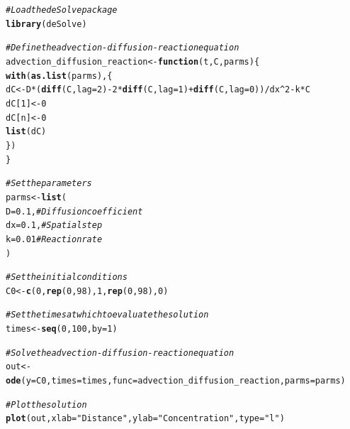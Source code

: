 \documentclass{tufte-handout}\usepackage[]{graphicx}\usepackage[]{xcolor}
\makeatletter
\newcommand{\hlnum}[1]{\textcolor[rgb]{0.686,0.059,0.569}{#1}}%
\newcommand{\hlstr}[1]{\textcolor[rgb]{0.192,0.494,0.8}{#1}}%
\newcommand{\hlcom}[1]{\textcolor[rgb]{0.678,0.584,0.686}{\textit{#1}}}%
\newcommand{\hlopt}[1]{\textcolor[rgb]{0,0,0}{#1}}%
\newcommand{\hlstd}[1]{\textcolor[rgb]{0.345,0.345,0.345}{#1}}%
\newcommand{\hlkwa}[1]{\textcolor[rgb]{0.161,0.373,0.58}{\textbf{#1}}}%
\newcommand{\hlkwb}[1]{\textcolor[rgb]{0.69,0.353,0.396}{#1}}%
\newcommand{\hlkwc}[1]{\textcolor[rgb]{0.333,0.667,0.333}{#1}}%
\newcommand{\hlkwd}[1]{\textcolor[rgb]{0.737,0.353,0.396}{\textbf{#1}}}%
\newenvironment{kframe}{%
 \def\at@end@of@kframe{}%
 \ifinner\ifhmode%
  \def\at@end@of@kframe{\end{minipage}}%
  \begin{minipage}{\columnwidth}%
 \fi\fi%
 \def\FrameCommand##1{\hskip\@totalleftmargin \hskip-\fboxsep
 \colorbox{shadecolor}{##1}\hskip-\fboxsep
     \hskip-\linewidth \hskip-\@totalleftmargin \hskip\columnwidth}%
 \MakeFramed {\advance\hsize-\width
   \@totalleftmargin\z@ \linewidth\hsize
   \@setminipage}}%
 {\par\unskip\endMakeFramed%
 \at@end@of@kframe}
\newenvironment{knitrout}{}{} %
\makeatother
\begin{document}
\begin{knitrout}
\color{fgcolor}\begin{kframe}
\begin{alltt}
\hlcom{# Load the deSolve package}
\hlkwd{library}\hlstd{(deSolve)}

\hlcom{# Define the advection-diffusion-reaction equation}
\hlstd{advection_diffusion_reaction} \hlkwb{<-} \hlkwa{function}\hlstd{(}\hlkwc{t}\hlstd{,} \hlkwc{C}\hlstd{,} \hlkwc{parms}\hlstd{) \{}
  \hlkwd{with}\hlstd{(}\hlkwd{as.list}\hlstd{(parms), \{}
    \hlstd{dC} \hlkwb{<-} \hlstd{D} \hlopt{*} \hlstd{(}\hlkwd{diff}\hlstd{(C,} \hlkwc{lag} \hlstd{=} \hlnum{2}\hlstd{)} \hlopt{-} \hlnum{2} \hlopt{*} \hlkwd{diff}\hlstd{(C,} \hlkwc{lag} \hlstd{=} \hlnum{1}\hlstd{)} \hlopt{+} \hlkwd{diff}\hlstd{(C,} \hlkwc{lag} \hlstd{=} \hlnum{0}\hlstd{))} \hlopt{/} \hlstd{dx}\hlopt{^}\hlnum{2} \hlopt{-} \hlstd{k} \hlopt{*} \hlstd{C}
    \hlstd{dC[}\hlnum{1}\hlstd{]} \hlkwb{<-} \hlnum{0}
    \hlstd{dC[n]} \hlkwb{<-} \hlnum{0}
    \hlkwd{list}\hlstd{(dC)}
  \hlstd{\})}
\hlstd{\}}

\hlcom{# Set the parameters}
\hlstd{parms} \hlkwb{<-} \hlkwd{list}\hlstd{(}
  \hlkwc{D} \hlstd{=} \hlnum{0.1}\hlstd{,}  \hlcom{# Diffusion coefficient}
  \hlkwc{dx} \hlstd{=} \hlnum{0.1}\hlstd{,}  \hlcom{# Spatial step}
  \hlkwc{k} \hlstd{=} \hlnum{0.01}  \hlcom{# Reaction rate}
\hlstd{)}

\hlcom{# Set the initial conditions}
\hlstd{C0} \hlkwb{<-} \hlkwd{c}\hlstd{(}\hlnum{0}\hlstd{,} \hlkwd{rep}\hlstd{(}\hlnum{0}\hlstd{,} \hlnum{98}\hlstd{),} \hlnum{1}\hlstd{,} \hlkwd{rep}\hlstd{(}\hlnum{0}\hlstd{,} \hlnum{98}\hlstd{),} \hlnum{0}\hlstd{)}

\hlcom{# Set the times at which to evaluate the solution}
\hlstd{times} \hlkwb{<-} \hlkwd{seq}\hlstd{(}\hlnum{0}\hlstd{,} \hlnum{100}\hlstd{,} \hlkwc{by} \hlstd{=} \hlnum{1}\hlstd{)}

\hlcom{# Solve the advection-diffusion-reaction equation}
\hlstd{out} \hlkwb{<-} \hlkwd{ode}\hlstd{(}\hlkwc{y} \hlstd{= C0,} \hlkwc{times} \hlstd{= times,} \hlkwc{func} \hlstd{= advection_diffusion_reaction,} \hlkwc{parms} \hlstd{= parms)}

\hlcom{# Plot the solution}
\hlkwd{plot}\hlstd{(out,} \hlkwc{xlab} \hlstd{=} \hlstr{"Distance"}\hlstd{,} \hlkwc{ylab} \hlstd{=} \hlstr{"Concentration"}\hlstd{,} \hlkwc{type} \hlstd{=} \hlstr{"l"}\hlstd{)}
\end{alltt}
\end{kframe}
\end{knitrout}
\end{document}
